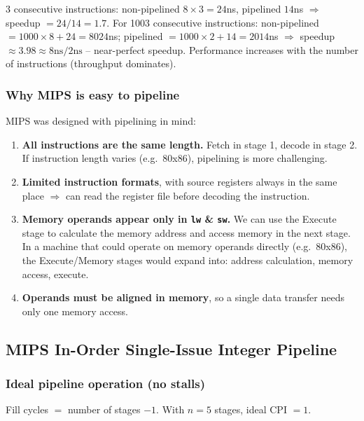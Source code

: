 \begin{eg}
3 consecutive instructions: non-pipelined
$8\times3=24$ns, pipelined $14$ns $\Rightarrow$ speedup $=24/14=1.7$.
For 1003 consecutive instructions: non-pipelined $=1000\times8+24=8024$ns;
pipelined $=1000\times2+14=2014$ns $\Rightarrow$ speedup $\approx 3.98 \approx
8\text{ns}/2\text{ns}$ -- near-perfect speedup. Performance increases with the
number of instructions (throughput dominates).
\end{eg}

\subsubsection{Why MIPS is easy to pipeline}

MIPS was designed with pipelining in mind:
\begin{enumerate}
  \item \textbf{All instructions are the same length.} Fetch in stage 1,
  decode in stage 2. If instruction length varies (e.g.\ 80x86), pipelining
  is more challenging.
  \item \textbf{Limited instruction formats}, with source registers always in
  the same place $\Rightarrow$ can read the register file before decoding
  the instruction.
  \item \textbf{Memory operands appear only in \texttt{lw} \& \texttt{sw}.}
  We can use the Execute stage to calculate the memory address and access
  memory in the next stage. In a machine that could operate on memory
  operands directly (e.g.\ 80x86), the Execute/Memory stages would expand
  into: address calculation, memory access, execute.
  \item \textbf{Operands must be aligned in memory}, so a single data
  transfer needs only one memory access.
\end{enumerate}

\subsection{MIPS In-Order Single-Issue Integer Pipeline}
\label{sec:mips-pipeline}

\subsubsection{Ideal pipeline operation (no stalls)}

Fill cycles $=$ number of stages $-1$. With $n=5$ stages, ideal CPI $=1$.

